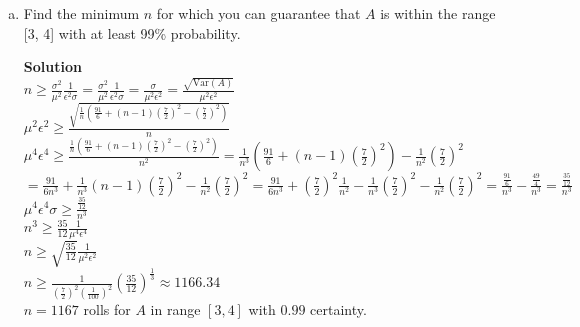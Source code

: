 \documentclass[11pt]{article}
\newenvironment{Answer}{\vspace{10pt}\begin{mdframed}\textbf{Solution}\\}{\end{mdframed}\vfill\pagebreak[3]}
\newenvironment{Answer}{\vspace{10pt}}{\vfill\pagebreak[3]}
\newcommand*{\Var}[1]{\text{Var}(#1)}
\begin{document}
\begin{enumerate}[(a)]
  \item Find the minimum $n$ for which you can guarantee that $A$ is within the range [3, 4] with at least 99\% probability.
  \begin{Answer}
$n \geq \frac{\sigma^2}{\mu^2}\frac{1}{\epsilon^2\sigma}=\frac{\sigma^2}{\mu^2}\frac{1}{\epsilon^2\sigma}=\frac{\sigma}{\mu^2\epsilon^2}=\frac{\sqrt{\Var{A}}}{\mu^2\epsilon^2}$\\
$\mu^2\epsilon^2 \geq \frac{\sqrt{\frac{1}{n}(\frac{91}{6}+(n-1)(\frac{7}{2})^2-(\frac{7}{2})^2
)}}{n}$\\
$\mu^4\epsilon^4 \geq \frac{\frac{1}{n}(\frac{91}{6}+(n-1)(\frac{7}{2})^2-(\frac{7}{2})^2)}{n^2} = \frac{1}{n^3}(\frac{91}{6}+(n-1)(\frac{7}{2})^2)-\frac{1}{n^2}(\frac{7}{2})^2$\\
$=\frac{91}{6n^3}+\frac{1}{n^3}(n-1)(\frac{7}{2})^2-\frac{1}{n^2}(\frac{7}{2})^2=\frac{91}{6n^3}+(\frac{7}{2})^2\frac{1}{n^2}-\frac{1}{n^3}(\frac{7}{2})^2-\frac{1}{n^2}(\frac{7}{2})^2=\frac{\frac{91}{6}}{n^3}-\frac{\frac{49}{4}}{n^3}=\frac{\frac{35}{12}}{n^3}$\\
$\mu^4\epsilon^4\sigma \geq \frac{\frac{35}{12}}{n^3}$\\
$n^3 \geq \frac{35}{12}\frac{1}{\mu^4\epsilon^4}$\\
$n \geq \sqrt{\frac{35}{12}}\frac{1}{\mu^2\epsilon^2}$\\
$n \geq \frac{1}{(\frac{7}{2})^2(\frac{1}{100})^2}(\frac{35}{12})^{\frac{1}{3}} \approx 1166.34$\\
$n=1167$ rolls for $A$ in range $[3,4]$ with $0.99$ certainty.
  \end{Answer}
\end{enumerate}
\end{document}
